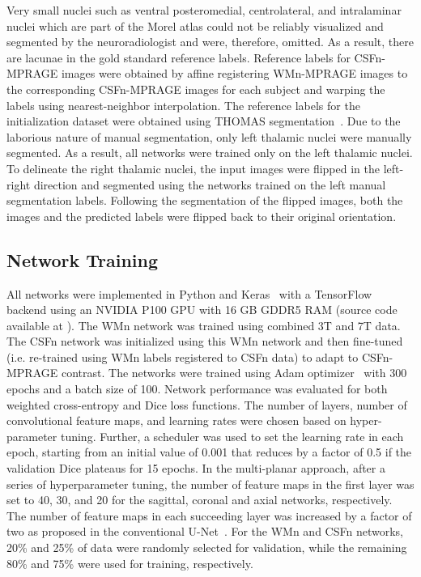 Very small nuclei such as ventral posteromedial, centrolateral, and intralaminar nuclei which are part of the Morel atlas could not be reliably visualized and segmented by the neuroradiologist and were, therefore, omitted. As a result, there are lacunae in the gold standard reference labels. Reference labels for CSFn-MPRAGE images were obtained by affine registering WMn-MPRAGE images to the corresponding CSFn-MPRAGE images for each subject and warping the labels using nearest-neighbor interpolation. The reference labels for the initialization dataset were obtained using THOMAS segmentation~\cite{1921968:27964332}. Due to the laborious nature of manual segmentation, only left thalamic nuclei were manually segmented. As a result, all networks were trained only on the left thalamic nuclei. To delineate the right thalamic nuclei, the input images were flipped in the left-right direction and segmented using the networks trained on the left manual segmentation labels. Following the segmentation of the flipped images, both the images and the predicted labels were flipped back to their original orientation.

\subsection{Network Training}

All networks were implemented in Python and Keras~\cite{1921968:27964371} with a TensorFlow backend using an NVIDIA P100 GPU with 16 GB GDDR5 RAM (source code available at ). The WMn network was trained using combined 3T and 7T data. The CSFn network was initialized using this WMn network and then fine-tuned (i.e. re-trained using WMn labels registered to CSFn data) to adapt to CSFn-MPRAGE contrast. The networks were trained using Adam optimizer~\cite{1921968:27964344} with 300 epochs and a batch size of 100. Network performance was evaluated for both weighted cross-entropy and Dice loss functions. The number of layers, number of convolutional feature maps, and learning rates were chosen based on hyper-parameter tuning. Further, a scheduler was used to set the learning rate in each epoch, starting from an initial value of 0.001 that reduces by a factor of 0.5 if the validation Dice plateaus for 15 epochs. In the multi-planar approach, after a series of hyperparameter tuning, the number of feature maps in the first layer was set to 40, 30, and 20 for the sagittal, coronal and axial networks, respectively. The number of feature maps in each succeeding layer was increased by a factor of two as proposed in the conventional U-Net~\cite{1921968:27964317}. For the WMn and CSFn networks, 20\% and 25\% of data were randomly selected for validation, while the remaining 80\% and 75\% were used for training, respectively.

